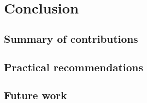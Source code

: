 \documentclass[11pt,a4paper]{report}
\begin{document}
\chapter{Conclusion}
\label{ch:conclusion}


\section{Summary of contributions}
\label{sec:conc-summary}

\section{Practical recommendations}
\label{sec:conc-recommendations}

\section{Future work}
\label{sec:conc-future-work}






\appendix
\end{document}
